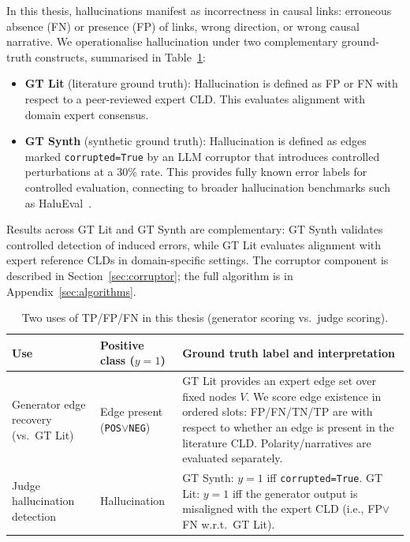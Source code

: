 In this thesis, hallucinations manifest as incorrectness in causal links: erroneous absence (FN) or presence (FP) of links, wrong direction, or wrong causal narrative. We operationalise hallucination under two complementary ground-truth constructs, summarised in Table~\ref{tab:tp_fp_fn_notation}:

\begin{itemize}[noitemsep,topsep=0.3em]
    \item \textbf{GT Lit} (literature ground truth): Hallucination is defined as FP or FN with respect to a peer-reviewed expert CLD. This evaluates alignment with domain expert consensus.
    \item \textbf{GT Synth} (synthetic ground truth): Hallucination is defined as edges marked \texttt{corrupted=True} by an LLM corruptor that introduces controlled perturbations at a 30\% rate. This provides fully known error labels for controlled evaluation, connecting to broader hallucination benchmarks such as HaluEval~\cite{li2023halueval}.
\end{itemize}

\noindent Results across GT Lit and GT Synth are complementary: GT Synth validates controlled detection of induced errors, while GT Lit evaluates alignment with expert reference CLDs in domain-specific settings. The corruptor component is described in Section~\ref{sec:corruptor}; the full algorithm is in Appendix~\ref{sec:algorithms}.

\begin{table}[H]
\centering
\small
\setlength{\tabcolsep}{5pt}
\renewcommand{\arraystretch}{1.15}
\caption{Two uses of TP/FP/FN in this thesis (generator scoring vs.\ judge scoring).}
\label{tab:tp_fp_fn_notation}
\begin{tabular}{p{3.2cm}p{4.0cm}p{7.3cm}}
\toprule
\textbf{Use} & \textbf{Positive class (\(y{=}1\))} & \textbf{Ground truth label and interpretation} \\
\midrule
Generator edge recovery (vs.\ GT Lit) &
Edge present (\texttt{POS}$\lor$\texttt{NEG}) &
GT Lit provides an expert edge set over fixed nodes \(V\). We score edge existence in ordered slots: FP/FN/TN/TP are with respect to whether an edge is present in the literature CLD. Polarity/narratives are evaluated separately. \\
\midrule
Judge hallucination detection &
Hallucination &
GT Synth: \(y{=}1\) iff \texttt{corrupted=True}. GT Lit: \(y{=}1\) iff the generator output is misaligned with the expert CLD (i.e., FP$\lor$FN w.r.t.\ GT Lit). \\
\bottomrule
\end{tabular}
\end{table}

